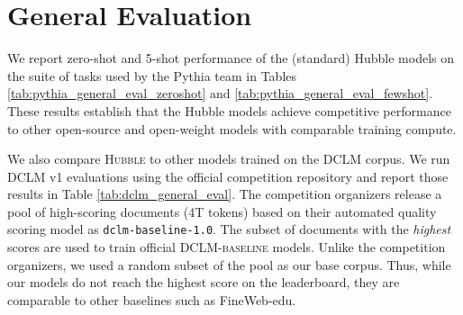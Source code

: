 \newpage
\section{General Evaluation}
\label{app:general_evals}


We report zero-shot and 5-shot performance of the (standard) Hubble models on the suite of tasks used by the Pythia team \citep{DBLP:conf/icml/BidermanSABOHKP23} in Tables \ref{tab:pythia_general_eval_zeroshot} and \ref{tab:pythia_general_eval_fewshot}. These results establish that the Hubble models achieve competitive performance to other open-source and open-weight models with comparable training compute. 

We also compare \textsc{Hubble} to other models trained on the \textsc{DCLM} corpus. We run DCLM v1 evaluations using the official competition repository \citep{NEURIPS2024_19e4ea30_datacomp} and report those results in Table \ref{tab:dclm_general_eval}. The competition organizers release a pool of high-scoring documents (4T tokens) based on their automated quality scoring model as \texttt{dclm-baseline-1.0}. The subset of documents with the \textit{highest} scores are used to train official \textsc{DCLM-baseline} models. Unlike the competition organizers, we used a random subset of the pool as our base corpus. Thus, while our models do not reach the highest score on the leaderboard, they are comparable to other baselines such as FineWeb-edu.









